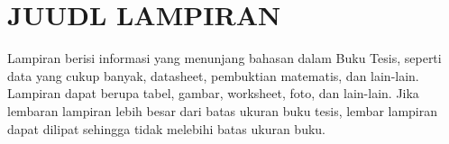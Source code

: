 \newpage
\chapter{JUUDL LAMPIRAN}
Lampiran berisi informasi yang menunjang bahasan dalam Buku Tesis, seperti data yang cukup banyak, datasheet, pembuktian matematis, dan lain-lain. Lampiran dapat berupa tabel, gambar, worksheet, foto, dan lain-lain. Jika lembaran lampiran lebih besar dari batas ukuran buku tesis, lembar lampiran dapat dilipat sehingga tidak melebihi batas ukuran buku.

